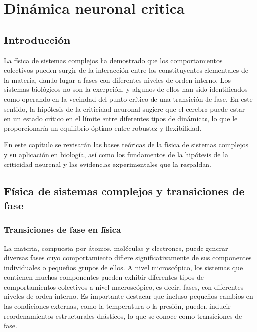 \chapter{Dinámica neuronal critica}\label{titulo-cap-critico}
\graphicspath{{figs/capitulo_critico/}}







\section{Introducción}

La física de sistemas complejos ha demostrado que los comportamientos colectivos pueden surgir de la interacción entre los constituyentes elementales de la materia, dando lugar a fases con diferentes niveles de orden interno. Los sistemas biológicos no son la excepción, y algunos de ellos han sido identificados como operando en la vecindad del punto crítico de una transición de fase. En este sentido, la hipótesis de la criticidad neuronal sugiere que el cerebro puede estar en un estado crítico en el límite entre diferentes tipos de dinámicas, lo que le proporcionaría un equilibrio óptimo entre robustez y flexibilidad.

En este capítulo se revisarán las bases teóricas de la física de sistemas complejos y su aplicación en biología, así como los fundamentos de la hipótesis de la criticidad neuronal y las evidencias experimentales que la respaldan.






\section{Física de sistemas complejos y transiciones de fase}

\subsection{Transiciones de fase en física}

La materia, compuesta por átomos, moléculas y electrones, puede generar diversas fases cuyo comportamiento difiere significativamente de sus componentes individuales o pequeños grupos de ellos. A nivel microscópico, los sistemas que contienen muchos componentes pueden exhibir diferentes tipos de comportamientos colectivos a nivel macroscópico, es decir, fases, con diferentes niveles de orden interno. Es importante destacar que incluso pequeños cambios en las condiciones externas, como la temperatura o la presión, pueden inducir reordenamientos estructurales drásticos, lo que se conoce como transiciones de fase.\\

